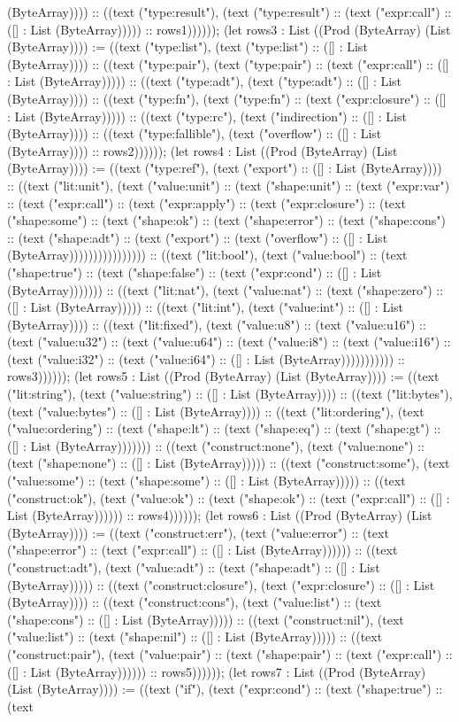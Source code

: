 \documentclass[11pt]{article}
\begin{document}
(ByteArray)))) :: ((text ("type:result"), (text ("type:result") :: (text ("expr:call") :: ([] : List (ByteArray))))) :: rows1)))))); (let rows3 : List ((Prod (ByteArray) (List (ByteArray)))) := ((text ("type:list"), (text ("type:list") :: ([] : List (ByteArray)))) :: ((text ("type:pair"), (text ("type:pair") :: (text ("expr:call") :: ([] : List (ByteArray))))) :: ((text ("type:adt"), (text ("type:adt") :: ([] : List (ByteArray)))) :: ((text ("type:fn"), (text ("type:fn") :: (text ("expr:closure") :: ([] : List (ByteArray))))) :: ((text ("type:rc"), (text ("indirection") :: ([] : List (ByteArray)))) :: ((text ("type:fallible"), (text ("overflow") :: ([] : List (ByteArray)))) :: rows2)))))); (let rows4 : List ((Prod (ByteArray) (List (ByteArray)))) := ((text ("type:ref"), (text ("export") :: ([] : List (ByteArray)))) :: ((text ("lit:unit"), (text ("value:unit") :: (text ("shape:unit") :: (text ("expr:var") :: (text ("expr:call") :: (text ("expr:apply") :: (text ("expr:closure") :: (text ("shape:some") :: (text ("shape:ok") :: (text ("shape:error") :: (text ("shape:cons") :: (text ("shape:adt") :: (text ("export") :: (text ("overflow") :: ([] : List (ByteArray)))))))))))))))) :: ((text ("lit:bool"), (text ("value:bool") :: (text ("shape:true") :: (text ("shape:false") :: (text ("expr:cond") :: ([] : List (ByteArray))))))) :: ((text ("lit:nat"), (text ("value:nat") :: (text ("shape:zero") :: ([] : List (ByteArray))))) :: ((text ("lit:int"), (text ("value:int") :: ([] : List (ByteArray)))) :: ((text ("lit:fixed"), (text ("value:u8") :: (text ("value:u16") :: (text ("value:u32") :: (text ("value:u64") :: (text ("value:i8") :: (text ("value:i16") :: (text ("value:i32") :: (text ("value:i64") :: ([] : List (ByteArray))))))))))) :: rows3)))))); (let rows5 : List ((Prod (ByteArray) (List (ByteArray)))) := ((text ("lit:string"), (text ("value:string") :: ([] : List (ByteArray)))) :: ((text ("lit:bytes"), (text ("value:bytes") :: ([] : List (ByteArray)))) :: ((text ("lit:ordering"), (text ("value:ordering") :: (text ("shape:lt") :: (text ("shape:eq") :: (text ("shape:gt") :: ([] : List (ByteArray))))))) :: ((text ("construct:none"), (text ("value:none") :: (text ("shape:none") :: ([] : List (ByteArray))))) :: ((text ("construct:some"), (text ("value:some") :: (text ("shape:some") :: ([] : List (ByteArray))))) :: ((text ("construct:ok"), (text ("value:ok") :: (text ("shape:ok") :: (text ("expr:call") :: ([] : List (ByteArray)))))) :: rows4)))))); (let rows6 : List ((Prod (ByteArray) (List (ByteArray)))) := ((text ("construct:err"), (text ("value:error") :: (text ("shape:error") :: (text ("expr:call") :: ([] : List (ByteArray)))))) :: ((text ("construct:adt"), (text ("value:adt") :: (text ("shape:adt") :: ([] : List (ByteArray))))) :: ((text ("construct:closure"), (text ("expr:closure") :: ([] : List (ByteArray)))) :: ((text ("construct:cons"), (text ("value:list") :: (text ("shape:cons") :: ([] : List (ByteArray))))) :: ((text ("construct:nil"), (text ("value:list") :: (text ("shape:nil") :: ([] : List (ByteArray))))) :: ((text ("construct:pair"), (text ("value:pair") :: (text ("shape:pair") :: (text ("expr:call") :: ([] : List (ByteArray)))))) :: rows5)))))); (let rows7 : List ((Prod (ByteArray) (List (ByteArray)))) := ((text ("if"), (text ("expr:cond") :: (text ("shape:true") :: (text 
\end{document}
